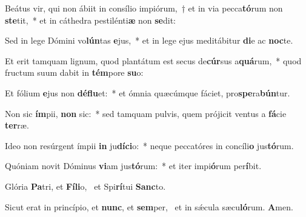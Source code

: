 \item Beátus vir, qui non ábiit in consílio impiórum,~† et in via pecca\textbf{tó}rum non \textbf{ste}tit,~* et in cáthedra pestilénti\textbf{æ} non \textbf{se}dit:
\item Sed in lege Dómini vo\textbf{lún}tas \textbf{e}jus,~* et in lege ejus meditábitur \textbf{di}e ac \textbf{noc}te.
\item Et erit tamquam lignum, quod plantátum est secus de\textbf{cúr}sus a\textbf{quá}rum,~* quod fructum suum dabit in \textbf{tém}pore \textbf{su}o:
\item Et fólium \textbf{e}jus non \textbf{dé}\textbf{flu}et:~* et ómnia quæcúmque fáciet, pro\textbf{spe}ra\textbf{bún}tur.
\item Non sic \textbf{ím}pii, \textbf{non} sic:~* sed tamquam pulvis, quem prójicit ventus a \textbf{fá}cie \textbf{ter}ræ.
\item Ideo non resúrgent ímpii \textbf{in} ju\textbf{dí}\textbf{ci}o:~* neque peccatóres in concíli\textbf{o} jus\textbf{tó}rum.
\item Quóniam novit Dóminus \textbf{vi}am jus\textbf{tó}rum:~* et iter impi\textbf{ó}rum per\textbf{í}bit.
\item Glória \textbf{Pa}tri, et \textbf{Fí}\textbf{li}o,~\psstar{} et Spi\textbf{rí}tui \textbf{Sanc}to.
\item Sicut erat in princípio, et \textbf{nunc}, et \textbf{sem}per,~\psstar{} et in sǽcula sæcu\textbf{ló}rum. \textbf{A}men.